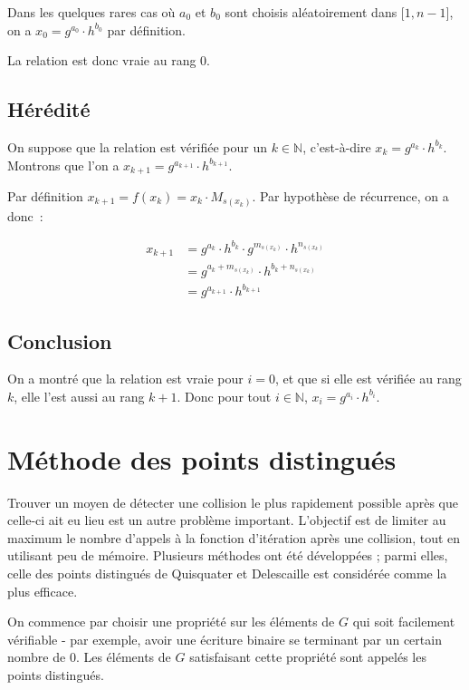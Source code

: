         Dans les quelques rares cas où $a_0$ et $b_0$ sont choisis aléatoirement dans $\mathopen{[}1,n-1\mathclose{]}$, on a $x_0 = g^{a_0} \cdot h^{b_0}$ par définition.
        
        La relation est donc vraie au rang $0$.
        
        \subsection*{Hérédité}
        On suppose que la relation est vérifiée pour un $k \in \mathbb{N}$, c'est-à-dire $x_k = g^{a_k} \cdot h^{b_k}$. Montrons que l'on a $x_{k+1} = g^{a_{k+1}} \cdot h^{b_{k+1}}$.
        
        Par définition $x_{k+1} = f(x_k) = x_k \cdot M_{s(x_k)}$. Par hypothèse de récurrence, on a donc~:
       
       \begin{align*}
          x_{k+1} &= g^{a_k} \cdot h^{b_k} \cdot g^{m_{s(x_k)}} \cdot h^{n_{s(x_k)}} \\
                  &= g^{a_k + m_{s(x_k)}} \cdot h^{b_k + n_{s(x_k)}} \\
                  &=g^{a_{k+1}} \cdot h^{b_{k+1}}
        \end{align*}
        
        \subsection*{Conclusion}
        On a montré que la relation est vraie pour $i = 0$, et que si elle est vérifiée au rang $k$, elle l'est aussi au rang $k + 1$. Donc pour tout $i \in \mathbb{N}$, $x_i = g^{a_i} \cdot h^{b_i}$.
        
        \section{Méthode des points distingués}
        Trouver un moyen de détecter une collision le plus rapidement possible après que celle-ci ait eu lieu est un autre problème important. L'objectif est de limiter au maximum le nombre d'appels à la fonction d'itération après une collision, tout en utilisant peu de mémoire. Plusieurs méthodes ont été développées ; parmi elles, celle des points distingués de Quisquater et Delescaille est considérée comme la plus efficace.
        
        On commence par choisir une propriété sur les éléments de $G$ qui soit facilement vérifiable - par exemple, avoir une écriture binaire se terminant par un certain nombre de $0$. Les éléments de $G$ satisfaisant cette propriété sont appelés les points distingués.
        
